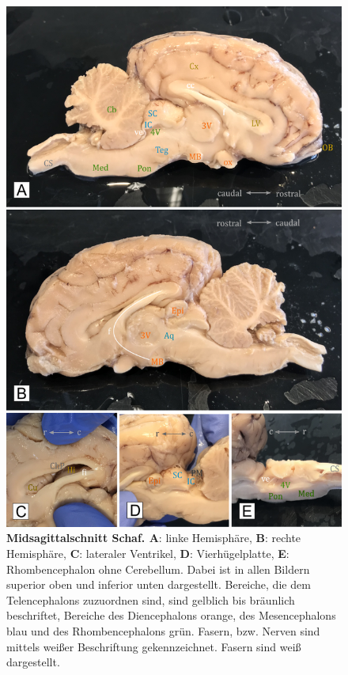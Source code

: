 \documentclass[12pt,a4paper,pdftex]{article}
\begin{document}
\begin{figure}[H]
\centering
\begin{minipage}[b]{.8\textwidth}
\includegraphics[width=\textwidth]{pictures/Bilder_Jule/Schaf/mittsagittal/schaf_mittsagittal_alle.png}
\end{minipage}
\caption[Midsagittalschnitt Schaf]{\textbf{Midsagittalschnitt Schaf. A}: linke Hemisphäre, \textbf{B}: rechte Hemisphäre, \textbf{C}: lateraler Ventrikel, \textbf{D}: Vierhügelplatte, \textbf{E}: Rhombencephalon ohne Cerebellum. Dabei ist in allen Bildern superior oben und inferior unten dargestellt. Bereiche, die dem Telencephalons zuzuordnen sind, sind gelblich bis bräunlich beschriftet, Bereiche des Diencephalons orange, des Mesencephalons blau und des Rhombencephalons grün. Fasern, bzw. Nerven sind mittels weißer Beschriftung gekennzeichnet. Fasern sind weiß dargestellt.}
\label{fig:schaf_midsagittal}
\end{figure}
\end{document}

